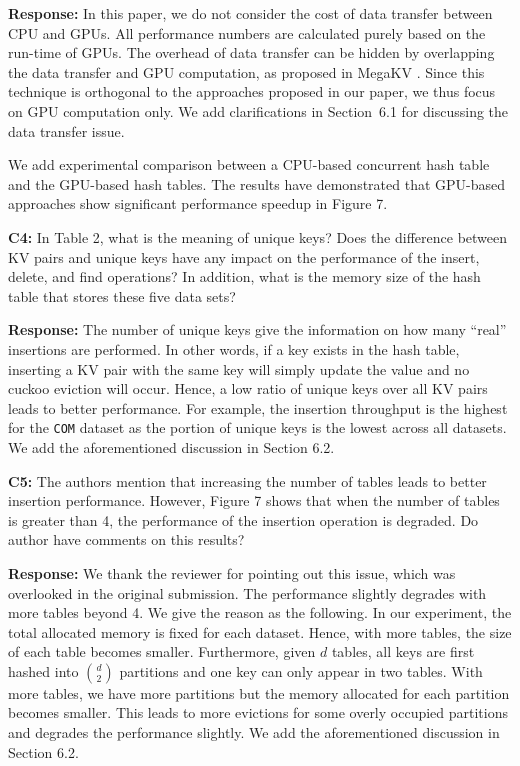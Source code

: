 \noindent\textbf{Response:} 
In this paper, we do not consider the cost of data transfer between CPU and GPUs. All performance numbers are calculated purely based on the run-time of GPUs. 
The overhead of data transfer can be hidden by overlapping the data transfer and GPU computation, as proposed in MegaKV \cite{zhang2015mega}. Since this technique is orthogonal to the approaches proposed in our paper, we thus focus on GPU computation only. We add clarifications in Section~6.1 for discussing the data transfer issue.

We add experimental comparison between a CPU-based concurrent hash table \cite{li2014algorithmic} and the GPU-based hash tables. The results have demonstrated that GPU-based approaches show significant performance speedup in Figure 7.  

\begin{shaded}
	\noindent\textbf{C4:} In Table 2, what is the meaning of unique keys? Does the difference between KV pairs and unique keys have any impact on the performance of the insert, delete, and find operations? In addition, what is the memory size of the hash table that stores these five data sets?
\end{shaded}

\noindent\textbf{Response:} 
The number of unique keys give the information on how many ``real'' insertions are performed. In other words, if a key exists in the hash table, inserting a KV pair with the same key will simply update the value and no cuckoo eviction will occur. Hence, a low ratio of unique keys over all KV pairs leads to better performance. For example, the insertion throughput is the highest for the {\tt COM} dataset as the portion of unique keys is the lowest across all datasets. We add the aforementioned discussion in Section 6.2.

\begin{shaded}
	\noindent\textbf{C5:} The authors mention that increasing the number of tables leads to better insertion performance. However, Figure 7 shows that when the number of tables is greater than 4, the performance of the insertion operation is degraded. Do author have comments on this results?
\end{shaded}

\noindent\textbf{Response:} We thank the reviewer for pointing out this issue, which was overlooked in the original submission. The performance slightly degrades with more tables beyond 4. We give the reason as the following. In our experiment, the total allocated memory is fixed for each dataset. 
Hence, with more tables, the size of each table becomes smaller. Furthermore, given $d$ tables, all keys are first hashed into $\binom{d}{2}$ partitions and one key can only appear in two tables. 
With more tables, we have more partitions but the memory allocated for each partition becomes smaller. This leads to more evictions for some overly occupied partitions and degrades the performance slightly. We add the aforementioned discussion in Section 6.2.